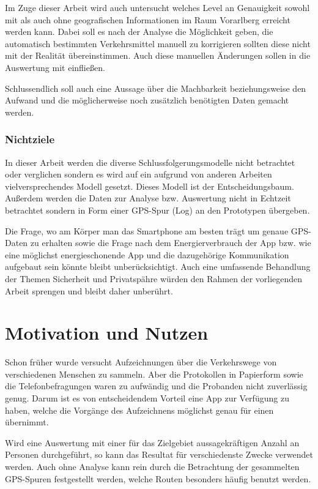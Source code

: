Im Zuge dieser Arbeit wird auch untersucht welches Level an Genauigkeit sowohl mit als auch ohne geografischen Informationen im Raum Vorarlberg erreicht werden kann. Dabei soll es nach der Analyse die Möglichkeit geben, die automatisch bestimmten Verkehrsmittel manuell zu korrigieren sollten diese nicht mit der Realität übereinstimmen. Auch diese manuellen Änderungen sollen in die Auswertung mit einfließen. 

Schlussendlich soll auch eine Aussage über die Machbarkeit beziehungsweise den Aufwand und die möglicherweise noch zusätzlich benötigten Daten gemacht werden.

\subsubsection{Nichtziele}

In dieser Arbeit werden die diverse Schlussfolgerungsmodelle nicht betrachtet oder verglichen sondern es wird auf ein aufgrund von anderen Arbeiten vielversprechendes Modell gesetzt. Dieses Modell ist der Entscheidungsbaum. Außerdem werden die Daten zur Analyse bzw. Auswertung nicht in Echtzeit betrachtet sondern in Form einer GPS-Spur (Log) an den Prototypen übergeben.

Die Frage, wo am Körper man das Smartphone am besten trägt um genaue GPS-Daten zu erhalten sowie die Frage nach dem Energierverbrauch der App bzw. wie eine möglichst energieschonende App und die dazugehörige Kommunikation aufgebaut sein könnte bleibt unberücksichtigt. Auch eine umfassende Behandlung der Themen Sicherheit und Privatspähre würden den Rahmen der vorliegenden Arbeit sprengen und bleibt daher unberührt.

\section{Motivation und Nutzen}
Schon früher wurde versucht Aufzeichnungen über die Verkehrswege von verschiedenen Menschen zu sammeln. Aber die Protokollen in Papierform sowie die Telefonbefragungen waren zu aufwändig und die Probanden nicht zuverlässig genug. Darum ist es von entscheidendem Vorteil eine App zur Verfügung zu haben, welche die Vorgänge des Aufzeichnens möglichst genau für einen übernimmt.

Wird eine Auswertung mit einer für das Zielgebiet aussagekräftigen Anzahl an Personen durchgeführt, so kann das Resultat  für verschiedenste Zwecke verwendet werden. Auch ohne  Analyse kann rein durch die Betrachtung der gesammelten GPS-Spuren festgestellt werden, welche Routen besonders häufig benutzt werden. 


